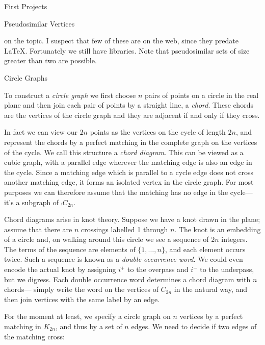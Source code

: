 \begin{chap}{First Projects}
\begin{sect}{Pseudosimilar Vertices}
\begin{para}
on the topic.  I suspect that few of these are on the web, since they
predate \LaTeX{}.  Fortunately we still have libraries. Note that pseudosimilar
sets of size greater than two are possible.
\end{para}
%
\end{sect}
%
\begin{sect}{Circle Graphs}
%
\begin{para}
To construct a \textsl{circle graph} we first choose $n$ pairs of points on a 
circle in the real plane and then join each pair of points by a straight line,
a \textsl{chord}. These chords are the vertices of the circle graph and they
are adjacent if and only if they cross.
\end{para}
%
\begin{para}
In fact we can view our $2n$ points as the vertices on the cycle of length
$2n$, and represent the chords by a perfect matching in the complete graph
on the vertices of the cycle. We call this structure a \textsl{chord diagram}.
This can be viewed as a cubic graph, with a parallel edge wherever the matching
edge is also an edge in the cycle.
Since a matching edge which is parallel to a cycle edge does not cross
another matching edge, it forms an isolated vertex in the circle
graph. For most purposes we can therefore assume that the matching has
no edge in the cycle---it's a subgraph of $\comp{C_{2n}}$.
\end{para}
%
\begin{para}
Chord diagrams arise in knot theory. Suppose we have a knot drawn in the
plane; assume that there are $n$ crossings labelled 1 through $n$. The knot is 
an embedding of a circle and, on walking around this circle we see a sequence
of $2n$ integers. The terms of the sequence are elements of $\{1,\ldots,n\}$,
and each element occurs twice. Such a sequence is known as a 
\textsl{double occurrence word}. We could even encode the actual knot by
assigning $i^+$ to the overpass and $i^-$ to the underpass, but we digress.
Each double occurrence word determines a chord diagram with $n$ chords---
simply write the word on the vertices of $C_{2n}$ in the natural way, and then
join vertices with the same label by an edge.
\end{para}
%
\begin{para}
For the moment at least, we specify a circle graph on $n$ vertices by a 
perfect matching in $K_{2n}$, and thus by a set of $n$ edges.
We need to decide if two edges of the matching cross:
\end{para}
%
\begin{sageblock}

\end{sageblock}
\end{sect}
\end{chap}
